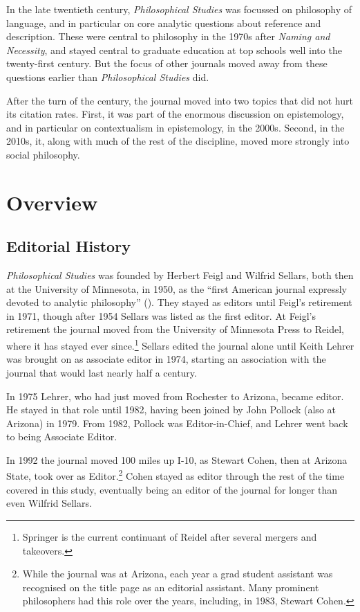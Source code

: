 \documentclass[
  11pt,
  letterpaper,
  DIV=11,
  numbers=noendperiod,
  twoside]{scrartcl}
\begin{document}
In the late twentieth century, \emph{Philosophical Studies} was focussed
on philosophy of language, and in particular on core analytic questions
about reference and description. These were central to philosophy in the
1970s after \emph{Naming and Necessity}, and stayed central to graduate
education at top schools well into the twenty-first century. But the
focus of other journals moved away from these questions earlier than
\emph{Philosophical Studies} did.

After the turn of the century, the journal moved into two topics that
did not hurt its citation rates. First, it was part of the enormous
discussion on epistemology, and in particular on contextualism in
epistemology, in the 2000s. Second, in the 2010s, it, along with much of
the rest of the discipline, moved more strongly into social philosophy.

\section{Overview}\label{sec-overview}

\subsection{Editorial History}\label{editorial-history}

\emph{Philosophical Studies} was founded by Herbert Feigl and Wilfrid
Sellars, both then at the University of Minnesota, in 1950, as the
``first American journal expressly devoted to analytic philosophy''
(). They stayed as editors
until Feigl's retirement in 1971, though after 1954 Sellars was listed
as the first editor. At Feigl's retirement the journal moved from the
University of Minnesota Press to Reidel, where it has stayed ever
since.\footnote{Springer is the current continuant of Reidel after
  several mergers and takeovers.} Sellars edited the journal alone until
Keith Lehrer was brought on as associate editor in 1974, starting an
association with the journal that would last nearly half a century.

In 1975 Lehrer, who had just moved from Rochester to Arizona, became
editor. He stayed in that role until 1982, having been joined by John
Pollock (also at Arizona) in 1979. From 1982, Pollock was
Editor-in-Chief, and Lehrer went back to being Associate Editor.

In 1992 the journal moved 100 miles up I-10, as Stewart Cohen, then at
Arizona State, took over as Editor.\footnote{While the journal was at
  Arizona, each year a grad student assistant was recognised on the
  title page as an editorial assistant. Many prominent philosophers had
  this role over the years, including, in 1983, Stewart Cohen.} Cohen
stayed as editor through the rest of the time covered in this study,
eventually being an editor of the journal for longer than even Wilfrid
Sellars.
\end{document}
